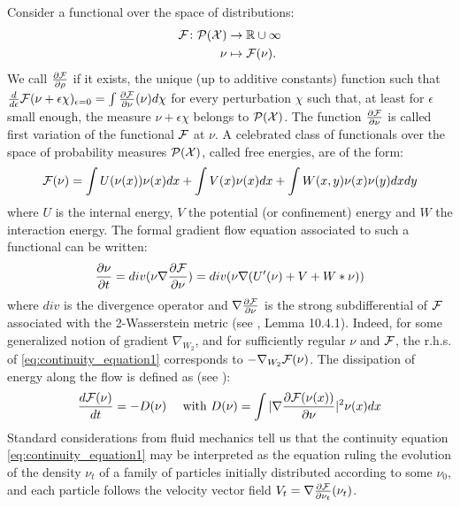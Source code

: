Consider a functional over the space of distributions:
\begin{align*}
{{\mathcal F}} \colon \mathcal{P}({{\mathcal X}}) &\to {{\mathbb R}} \cup \infty\\
\nu &\mapsto {{\mathcal F}}(\nu).
\end{align*}
We call $\frac{\partial{{{\mathcal F}}}}{\partial{\rho}}$ if it exists, the unique (up to additive constants) function such that $\frac{d}{d\epsilon}{{\mathcal F}}(\nu+\epsilon  \chi)_{\epsilon=0}=\int\frac{\partial{{{\mathcal F}}}}{\partial{\nu}}(\nu) d\chi$ for every perturbation $\chi$ such that, at least for $\epsilon$ small enough, the measure $\nu +\epsilon \chi$ belongs to $\mathcal{P}({{\mathcal X}})$. The function $\frac{\partial{{{\mathcal F}}}}{\partial{\nu}}$ is called first variation of the functional ${{\mathcal F}}$ at $\nu$. 
A celebrated class of functionals over the space of probability measures $\mathcal{P}({{\mathcal X}})$, called free energies, are of the form:
\begin{equation}\label{eq:lyapunov}
{{\mathcal F}}(\nu)=\int U(\nu(x)) \nu(x)dx + \int V(x)\nu(x)dx + \int W(x,y)\nu(x)\nu(y)dxdy
\end{equation}
where  $U$ is the internal energy, $V$ the potential (or confinement) energy and $W$ the
interaction energy. The formal gradient flow equation associated to such a functional can be written:
\begin{equation}\label{eq:continuity_equation1}
\frac{\partial \nu}{\partial t}= div( \nu \nabla \frac{\partial {{\mathcal F}}}{\partial \nu})=div( \nu \nabla (U'(\nu) + V + W * \nu))
\end{equation}
where $div$ is the divergence operator and $\nabla \frac{\partial {{\mathcal F}}}{\partial \nu}$ is the strong subdifferential of ${{\mathcal F}}$ associated with the 2-Wasserstein
metric (see \cite{ambrosio2008gradient}, Lemma 10.4.1). Indeed, for some generalized notion of gradient $\nabla_{W_2}$, and for sufficiently regular $\nu$ and ${{\mathcal F}}$, the r.h.s. of \eqref{eq:continuity_equation1} corresponds to $-\nabla_{W_2}{{\mathcal F}}(\nu)$.
The dissipation of energy along the flow is defined as (see \cite{Villani:2004}): 
\begin{align}\label{eq:dissipation_energy}
       \frac{d {{\mathcal F}}(\nu)}{dt} =-D(\nu) \quad \text{ with } D(\nu)= \int |\nabla \frac{\partial {{\mathcal F}}(\nu(x))}{\partial \nu}|^2 \nu(x)dx
\end{align}
Standard considerations from fluid mechanics tell us that the continuity equation \eqref{eq:continuity_equation1} may be interpreted as the equation ruling the evolution of the density $\nu_t$ of a family of particles initially distributed according to some $\nu_0$, and each particle follows the velocity vector field $V_t=\nabla \frac{\partial{{{\mathcal F}}}}{\partial{\nu_t}}(\nu_t)$.

